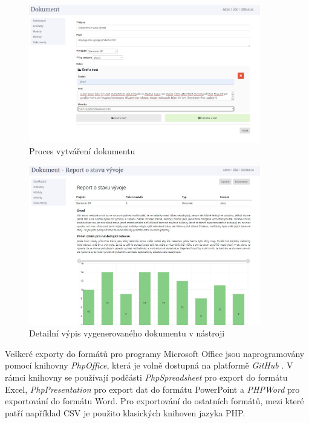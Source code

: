 \documentclass[czech,master]{diploma}
\begin{document}
\begin{figure}[!ht]
    \centering
    \includegraphics[width=0.9\textwidth]{Diplomka/Figures/report_document.jpg}
    \caption{Proces vytváření dokumentu}
    \label{fig:report_document}
\end{figure}

\begin{figure}[!ht]
    \centering
    \includegraphics[width=0.9\textwidth]{Diplomka/Figures/report_document_detail.jpg}
    \caption{Detailní výpis vygenerovaného dokumentu v nástroji}
    \label{fig:report_document_detail}
\end{figure}

Veškeré exporty do formátů pro programy Microsoft Office jsou naprogramovány pomocí knihovny \textit{PhpOffice}, která je volně dostupná na platformě \textit{GitHub} \cite{ref:phpoffice}. V rámci knihovny se používají podčásti \textit{PhpSpreadsheet} pro export do formátu Excel, \textit{PhpPresentation} pro export dat do formátu PowerPoint a \textit{PHPWord} pro exportování do formátu Word. Pro exportování do ostatních formátů, mezi které patří například CSV je použito klasických knihoven jazyka PHP.
\end{document}
